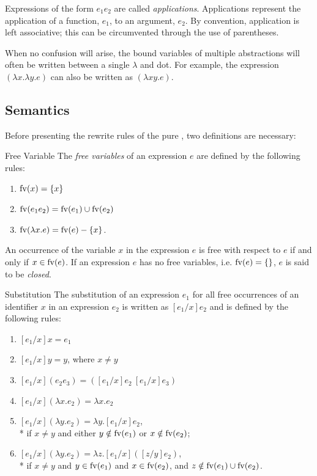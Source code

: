 Expressions of the form \(e_1 e_2\) are called \emph{applications}.
Applications represent the application of a function, \(e_1\), to an argument,
\(e_2\). By convention, application is left associative; this can be
circumvented through the use of parentheses.

When no confusion will arise, the bound variables of multiple abstractions will
often be written between a single \(\lambda\) and dot. For example, the
expression \((\lambda x.\lambda y.e)\) can also be written as
\((\lambda xy.e)\).

\subsection{Semantics}

Before presenting the rewrite rules of the pure \lambdacalculus, two
definitions are necessary:

\begin{insetdefinition}{Free Variable}
The \emph{free variables} of an expression \(e\) are defined by the following rules:
\begin{enumerate}[itemsep=0.25em]
\item \(\operatorname{fv}(x) = \{x\}\)
\item \(\operatorname{fv}(e_1e_2) = \operatorname{fv}(e_1) \cup \operatorname{fv}(e_2)\)
\item \(\operatorname{fv}(\lambda x.e) = \operatorname{fv}(e) - \{x\}\).
\end{enumerate}
An occurrence of the variable \(x\) in the expression \(e\) is free with respect
to \(e\) if and only if \(x \in \operatorname{fv}(e)\). If an expression \(e\) has no free
variables, i.e. \(\operatorname{fv}(e)=\{\}\), \(e\) is said to be \emph{closed}.
\end{insetdefinition}

\begin{insetdefinition}{Substitution}
The substitution of an expression \(e_1\) for all free occurrences of an
identifier \(x\) in an expression \(e_2\) is written as \([e_1/x]e_2\) and is
defined by the following rules:
\begin{enumerate}[itemsep=0.25em]
\item \([e_1/x]x = e_1\)
\item \([e_1/x]y = y\), where \(x \ne y\)
\item \([e_1/x](e_2e_3) = ([e_1/x]e_2\ [e_1/x]e_3)\)
\item \([e_1/x](\lambda x.e_2) = \lambda x.e_2\)
\item \([e_1/x](\lambda y.e_2) = \lambda y.[e_1/x]e_2\),\\*
  \hspace*{1em}if \(x \ne y\) and either \(y \notin \operatorname{fv}(e_1)\) or \(x \notin \operatorname{fv}(e_2)\);
\item \([e_1/x](\lambda y.e_2) = \lambda z.[e_1/x]([z/y]e_2)\),\\*
  \hspace*{1em}if \(x \ne y\) and \(y \in \operatorname{fv}(e_1)\) and \(x \in \operatorname{fv}(e_2)\), and
  \(z \notin \operatorname{fv}(e_1) \cup \operatorname{fv}(e_2)\).
\end{enumerate}
\end{insetdefinition}

